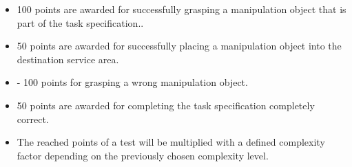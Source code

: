 \begin{itemize}
\item 100 points are awarded for successfully grasping a manipulation object that is part of the task specification..
\item 50 points are awarded for successfully placing a manipulation object into the destination service area.
\item - 100 points for grasping a wrong manipulation object.
\item 50 points are awarded for completing the task specification completely correct. 
\item The reached points of a test will be multiplied with a defined complexity factor depending on the previously chosen complexity level.
\end{itemize}

